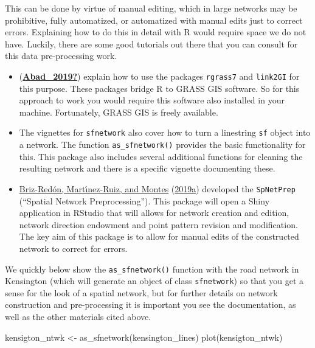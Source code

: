 \documentclass[
  krantz2]{krantz}
\makeatletter
\newenvironment{Shaded}{\begin{snugshade}}{\end{snugshade}}
\newcommand{\FunctionTok}[1]{\textcolor[rgb]{0,0,0}{#1}}
\newcommand{\NormalTok}[1]{#1}
\newcommand{\OtherTok}[1]{\textcolor[rgb]{0.37,0.37,0.37}{#1}}
\providecommand{\tightlist}{%
  \setlength{\itemsep}{0pt}\setlength{\parskip}{0pt}}
\newenvironment{kframe}{%
\medskip{}
\setlength{\fboxsep}{.8em}
 \def\at@end@of@kframe{}%
 \ifinner\ifhmode%
  \def\at@end@of@kframe{\end{minipage}}%
  \begin{minipage}{\columnwidth}%
 \fi\fi%
 \def\FrameCommand##1{\hskip\@totalleftmargin \hskip-\fboxsep
 \colorbox{shadecolor}{##1}\hskip-\fboxsep
     \hskip-\linewidth \hskip-\@totalleftmargin \hskip\columnwidth}%
 \MakeFramed {\advance\hsize-\width
   \@totalleftmargin\z@ \linewidth\hsize
   \@setminipage}}%
 {\par\unskip\endMakeFramed%
 \at@end@of@kframe}
\renewenvironment{Shaded}{\begin{kframe}}{\end{kframe}}
\makeatother
\begin{document}
This can be done by virtue of manual editing, which in large networks may be prohibitive, fully automatized, or automatized with manual edits just to correct errors. Explaining how to do this in detail with R would require space we do not have. Luckily, there are some good tutorials out there that you can consult for this data pre-processing work.

\begin{itemize}
\tightlist
\item
  (\protect\hyperlink{ref-Abad_2019}{\textbf{Abad\_2019?}}) explain how to use the packages \texttt{rgrass7} and \texttt{link2GI} for this purpose. These packages bridge R to GRASS GIS software. So for this approach to work you would require this software also installed in your machine. Fortunately, GRASS GIS is freely available.
\item
  The vignettes for \texttt{sfnetwork} also cover how to turn a linestring \texttt{sf} object into a network. The function \texttt{as\_sfnetwork()} provides the basic functionality for this. This package also includes several additional functions for cleaning the resulting network and there is a specific vignette documenting these.
\item
  \protect\hyperlink{ref-BrizRedon_2019a}{Briz-Redón, Martı́nez-Ruiz, and Montes} (\protect\hyperlink{ref-BrizRedon_2019a}{2019a}) developed the \texttt{SpNetPrep} (``Spatial Network Preprocessing''). This package will open a Shiny application in RStudio that will allows for network creation and edition, network direction endowment and point pattern revision and modiﬁcation. The key aim of this package is to allow for manual edits of the constructed network to correct for errors.
\end{itemize}

We quickly below show the \texttt{as\_sfnetwork()} function with the road network in Kensington (which will generate an object of class \texttt{sfnetwork}) so that you get a sense for the look of a spatial network, but for further details on network construction and pre-processing it is important you see the documentation, as well as the other materials cited above.

\begin{Shaded}
\begin{Highlighting}[]
\NormalTok{kensigton\_ntwk }\OtherTok{\textless{}{-}} \FunctionTok{as\_sfnetwork}\NormalTok{(kensington\_lines)}
\FunctionTok{plot}\NormalTok{(kensigton\_ntwk)}
\end{Highlighting}
\end{Shaded}
\end{document}

